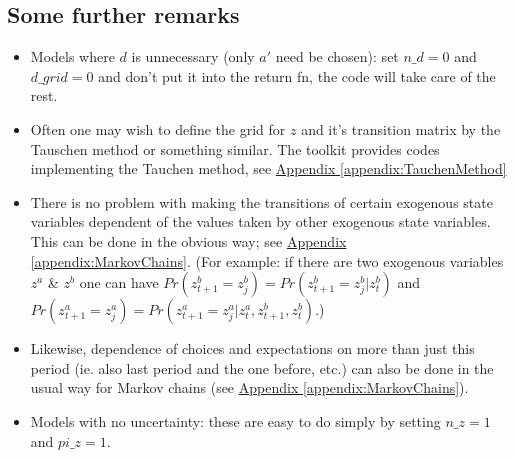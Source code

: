 \subsection{Some further remarks}
\begin{itemize}
 \item Models where $d$ is unnecessary (only $a'$ need be chosen): set $n\_{}d=0$ and $d\_{}grid=0$ and don't put it into the return fn, the code will
    take care of the rest.
 \item Often one may wish to define the grid for $z$ and it's transition matrix by the Tauschen method or something similar. The toolkit provides codes
    implementing the Tauchen method, see \hyperref[appendix:TauchenMethod]{Appendix \ref*{appendix:TauchenMethod}}
 \item There is no problem with making the transitions of certain exogenous state variables dependent of the values taken by other exogenous state variables.
    This can be done in the obvious way; see \hyperref[appendix:MarkovChains]{Appendix \ref*{appendix:MarkovChains}}. (For example: if there are two exogenous variables $z^a$ \& $z^b$ one can have $Pr(z^b_{t+1}=z^b_j)=
    Pr(z^b_{t+1}=z^b_j | z^b_t)$ and $Pr(z^a_{t+1}=z^a_j)=Pr(z^a_{t+1}=z^a_j | z^a_t, z^b_{t+1}, z^b_t)$.)
 \item Likewise, dependence of choices and expectations on more than just this period (ie. also last period and the one before, etc.) can also
    be done in the usual way for Markov chains (see \hyperref[appendix:MarkovChains]{Appendix \ref*{appendix:MarkovChains}}).
 \item Models with no uncertainty: these are easy to do simply by setting $n\_{}z=1$ and $pi\_{}z=1$.
\end{itemize}

